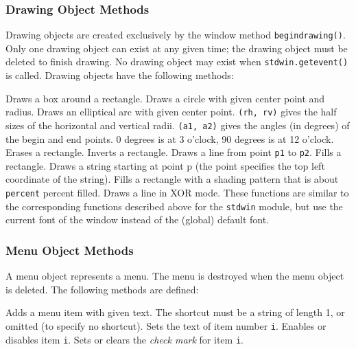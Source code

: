\subsubsection{Drawing Object Methods}

Drawing objects are created exclusively by the window method
{\tt begindrawing()}.
Only one drawing object can exist at any given time; the drawing object
must be deleted to finish drawing.
No drawing object may exist when
{\tt stdwin.getevent()}
is called.
Drawing objects have the following methods:
\begin{description}
Draws a box around a rectangle.
Draws a circle with given center point and radius.
Draws an elliptical arc with given center point.
{\tt (rh, rv)}
gives the half sizes of the horizontal and vertical radii.
{\tt (a1, a2)}
gives the angles (in degrees) of the begin and end points.
0 degrees is at 3 o'clock, 90 degrees is at 12 o'clock.
Erases a rectangle.
Inverts a rectangle.
Draws a line from point
{\tt p1}
to
{\tt p2}.
Fills a rectangle.
Draws a string starting at point p (the point specifies the
top left coordinate of the string).
Fills a rectangle with a shading pattern that is about
{\tt percent}
percent filled.
Draws a line in XOR mode.
These functions are similar to the corresponding functions described
above for the
{\tt stdwin}
module, but use the current font of the window instead of the (global)
default font.
\end{description}

\subsubsection{Menu Object Methods}

A menu object represents a menu.
The menu is destroyed when the menu object is deleted.
The following methods are defined:
\begin{description}
Adds a menu item with given text.
The shortcut must be a string of length 1, or omitted (to specify no
shortcut).
Sets the text of item number
{\tt i}.
Enables or disables item
{\tt i}.
Sets or clears the
{\em check mark}
for item
{\tt i}.
\end{description}

